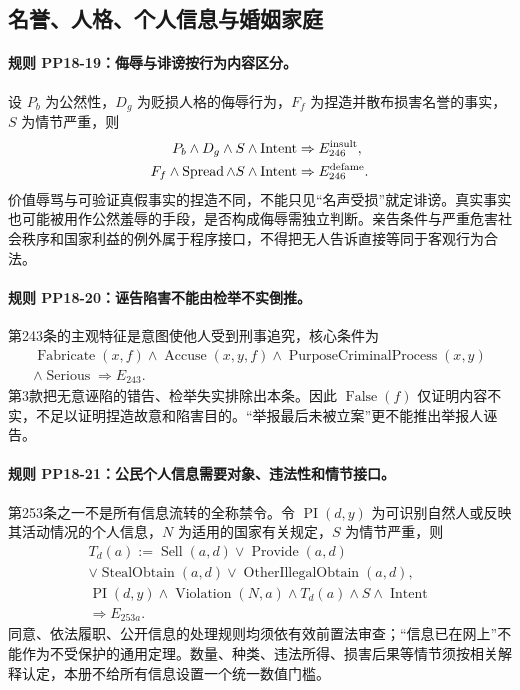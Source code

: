 \subsection{名誉、人格、个人信息与婚姻家庭}
\paragraph{规则 PP18-19：侮辱与诽谤按行为内容区分。}
\mbox{}\par
设 $P_b$ 为公然性，$D_g$ 为贬损人格的侮辱行为，$F_f$ 为捏造并散布损害名誉的事实，$S$ 为情节严重，则
\[
\begin{aligned}
P_b\land D_g\land S\land\operatorname{Intent}&\Rightarrow E_{246}^{\rm insult},\\
F_f\land\operatorname{Spread}\land S\land\operatorname{Intent}
&\Rightarrow E_{246}^{\rm defame}.
\end{aligned}
\]
价值辱骂与可验证真假事实的捏造不同，不能只见“名声受损”就定诽谤。真实事实也可能被用作公然羞辱的手段，是否构成侮辱需独立判断。亲告条件与严重危害社会秩序和国家利益的例外属于程序接口，不得把无人告诉直接等同于客观行为合法。

\paragraph{规则 PP18-20：诬告陷害不能由检举不实倒推。}
\mbox{}\par
第243条的主观特征是意图使他人受到刑事追究，核心条件为
\[
\begin{gathered}
\operatorname{Fabricate}(x,f)\land\operatorname{Accuse}(x,y,f)
\land\operatorname{PurposeCriminalProcess}(x,y)\\
\land\operatorname{Serious}\Rightarrow E_{243}.
\end{gathered}
\]
第3款把无意诬陷的错告、检举失实排除出本条。因此 $\operatorname{False}(f)$ 仅证明内容不实，不足以证明捏造故意和陷害目的。“举报最后未被立案”更不能推出举报人诬告。

\paragraph{规则 PP18-21：公民个人信息需要对象、违法性和情节接口。}
\mbox{}\par
第253条之一不是所有信息流转的全称禁令。令 $\operatorname{PI}(d,y)$ 为可识别自然人或反映其活动情况的个人信息，$N$ 为适用的国家有关规定，$S$ 为情节严重，则
\[
\begin{gathered}
T_d(a):=\operatorname{Sell}(a,d)\lor\operatorname{Provide}(a,d)\\
\lor\operatorname{StealObtain}(a,d)
\lor\operatorname{OtherIllegalObtain}(a,d),\\
\operatorname{PI}(d,y)\land\operatorname{Violation}(N,a)
\land T_d(a)\land S\land\operatorname{Intent}\\
\Rightarrow E_{253a}.
\end{gathered}
\]
同意、依法履职、公开信息的处理规则均须依有效前置法审查；“信息已在网上”不能作为不受保护的通用定理。数量、种类、违法所得、损害后果等情节须按相关解释认定，本册不给所有信息设置一个统一数值门槛。


